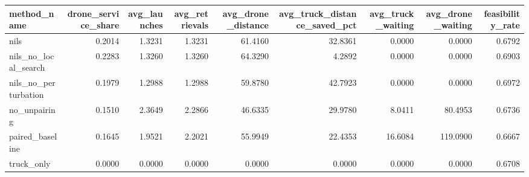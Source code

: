 \begin{tabular}{lrrrrrrrr}
\toprule
method_name & drone_service_share & avg_launches & avg_retrievals & avg_drone_distance & avg_truck_distance_saved_pct & avg_truck_waiting & avg_drone_waiting & feasibility_rate \\
\midrule
nils & 0.2014 & 1.3231 & 1.3231 & 61.4160 & 32.8361 & 0.0000 & 0.0000 & 0.6792 \\
nils_no_local_search & 0.2283 & 1.3260 & 1.3260 & 64.3290 & 4.2892 & 0.0000 & 0.0000 & 0.6903 \\
nils_no_perturbation & 0.1979 & 1.2988 & 1.2988 & 59.8780 & 42.7923 & 0.0000 & 0.0000 & 0.6972 \\
no_unpairing & 0.1510 & 2.3649 & 2.2866 & 46.6335 & 29.9780 & 8.0411 & 80.4953 & 0.6736 \\
paired_baseline & 0.1645 & 1.9521 & 2.2021 & 55.9949 & 22.4353 & 16.6084 & 119.0900 & 0.6667 \\
truck_only & 0.0000 & 0.0000 & 0.0000 & 0.0000 & 0.0000 & 0.0000 & 0.0000 & 0.6708 \\
\bottomrule
\end{tabular}
